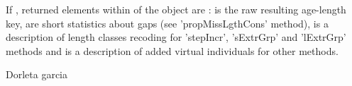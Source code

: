 \begin{Value}
If , returned elements within  of the  object are :  is the raw resulting age-length key,  are short statistics about gaps (see 'propMissLgthCons' method), 
 is a description of length classes recoding for 'stepIncr', 'sExtrGrp' and 'lExtrGrp' methods and  is a description of added virtual individuals 
for other methods.
\end{Value}
\begin{Author}\relax
Dorleta garcia 
\end{Author}
\begin{SeeAlso}\relax
{}
\end{SeeAlso}

